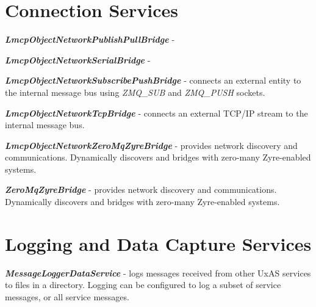 \section{Connection Services}\label{connection-services}

\textbf{\emph{LmcpObjectNetworkPublishPullBridge}} -

\textbf{\emph{LmcpObjectNetworkSerialBridge}} -

\textbf{\emph{LmcpObjectNetworkSubscribePushBridge}} - connects an
external entity to the internal message bus using \emph{ZMQ\_SUB} and
\emph{ZMQ\_PUSH} sockets.

\textbf{\emph{LmcpObjectNetworkTcpBridge}} - connects an external TCP/IP
stream to the internal message bus.

\textbf{\emph{LmcpObjectNetworkZeroMqZyreBridge}} - provides network
discovery and communications. Dynamically discovers and bridges with
zero-many Zyre-enabled systems.

\textbf{\emph{ZeroMqZyreBridge}} - provides network discovery and
communications. Dynamically discovers and bridges with zero-many
Zyre-enabled systems.

\section{Logging and Data Capture
Services}\label{logging-and-data-capture-services}

\textbf{\emph{MessageLoggerDataService}} - logs messages received from other UxAS services to files in a directory. Logging can be configured to log a subset of service messages, or all service messages.
